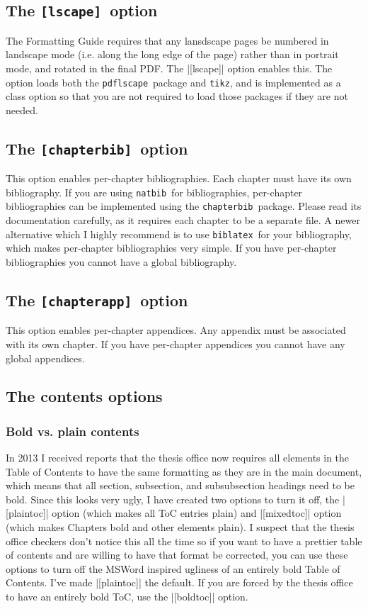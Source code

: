 \documentclass[11pt]{article}
\newcommand*{\pkg}[1]{\texttt{#1}}
\begin{document}
\subsection{The \pkg{[lscape]}~option}
The Formatting Guide requires that any lansdscape pages be numbered in landscape mode (i.e. along the long edge of the page) rather than in portrait mode, and rotated in the final PDF. The |[lscape]| option enables this. The option loads both the \pkg{pdflscape}\ package and \pkg{tikz}, and is implemented as a class option so that you are not required to load those packages if they are not needed.
\subsection{The \pkg{[chapterbib]}~option}
This option enables per-chapter bibliographies. Each chapter must have its own bibliography. If you are using \pkg{natbib}\ for bibliographies, per-chapter bibliographies can be implemented using the \pkg{chapterbib}\ package. Please read its documentation carefully, as it requires each chapter to be a separate file. A newer alternative which I highly recommend is to use \pkg{biblatex}\ for your bibliography, which makes per-chapter bibliographies very simple. If you have per-chapter bibliographies you cannot have a global bibliography.
\subsection{The \pkg{[chapterapp]}~option}
This option enables per-chapter appendices. Any appendix must be associated with its own chapter. If you have per-chapter appendices you cannot have any global appendices. 
\subsection{The contents options}
\subsubsection{Bold vs. plain contents}
In 2013 I received reports that the thesis office now requires all elements in the Table of Contents to have the same formatting as they are in the main document, which means that all section, subsection, and subsubsection headings need to be bold.  Since this looks very ugly, I have created two options to turn it off, the |[plaintoc]| option (which makes all ToC entries plain) and |[mixedtoc]| option (which makes Chapters bold and other elements plain). I suspect that the thesis office checkers don't notice this all the time so if you want to have a prettier table of contents and are willing to have that format be corrected, you can use these options to turn off the MSWord inspired ugliness of an entirely bold Table of Contents. I've made |[plaintoc]| the default.  If you are forced by the thesis office to have an entirely bold ToC, use the |[boldtoc]| option.
\end{document}
